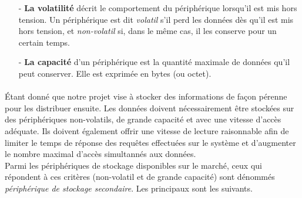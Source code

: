 \begin{itemize}
	\item[-] \textbf{La volatilit\'e} d\'ecrit le comportement du p\'eriph\'erique lorsqu'il est mis hors tension. Un p\'eriph\'erique est dit \emph{volatil} s'il perd les donn\'ees d\`es qu'il est mis hors tension, et \emph{non-volatil} si, dans le m\^eme cas, il les conserve pour un certain temps.\\
	\item[-] \textbf{La capacit\'e} d'un p\'eriph\'erique est la quantit\'e maximale de donn\'ees qu'il peut conserver. Elle est exprim\'ee en bytes (ou octet).
\end{itemize}



\paragraph{} \'Etant donn\'e que notre projet vise \`a stocker des informations de fa\c{c}on p\'erenne pour les distribuer ensuite. Les donn\'ees doivent n\'ecessairement \^etre stock\'ees sur des p\'eriph\'eriques non-volatils, de grande capacit\'e et avec une vitesse d'acc\`es ad\'equate. Ils doivent \'egalement offrir une vitesse de lecture raisonnable afin de limiter le temps de r\'eponse des requ\^etes effectu\'ees sur le syst\`eme et d'augmenter le nombre maximal d'acc\`es simultann\'es aux donn\'ees. \\
Parmi les p\'eriph\'eriques de stockage disponibles sur le march\'e, ceux qui r\'epondent \`a ces crit\`eres (non-volatil et de grande capacit\'e) sont d\'enomm\'es \emph{p\'eriph\'erique de stockage secondaire}\cite{stockagesSecondaire}. Les principaux sont les suivants.\\

